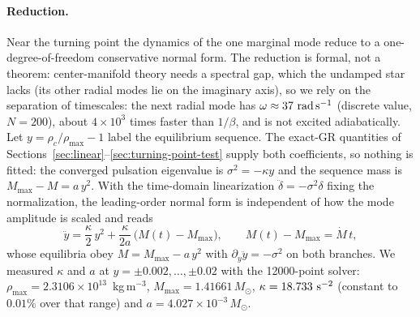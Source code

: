 \documentclass[11pt]{article}
\begin{document}
\paragraph{Reduction.} Near the turning point the dynamics of the one marginal mode reduce to a one-degree-of-freedom conservative normal form. The reduction is formal, not a theorem: center-manifold theory \citep{Carr1981,HaragusIooss2011} needs a spectral gap, which the undamped star lacks (its other radial modes lie on the imaginary axis), so we rely on the separation of timescales: the next radial mode has $\omega\approx37\ {\rm rad\,s^{-1}}$ (discrete value, $N=200$), about $4\times10^{3}$ times faster than $1/\beta$, and is not excited adiabatically. Let $y=\rho_c/\rho_{\max}-1$ label the equilibrium sequence. The exact-GR quantities of Sections~\ref{sec:linear}--\ref{sec:turning-point-test} supply both coefficients, so nothing is fitted: the converged pulsation eigenvalue is $\sigma^2=-\kappa y$ and the sequence mass is $M_{\max}-M=a\,y^2$. With the time-domain linearization $\ddot\delta=-\sigma^2\delta$ fixing the normalization, the leading-order normal form is independent of how the mode amplitude is scaled and reads
\begin{equation}
\ddot y=\frac{\kappa}{2}\,y^2+\frac{\kappa}{2a}\,\big(M(t)-M_{\max}\big),\qquad M(t)-M_{\max}=\dot M\,t ,
\label{eq:fold-nf}
\end{equation}
whose equilibria obey $M=M_{\max}-a\,y^2$ with $\partial_y\ddot y=-\sigma^2$ on both branches. We measured $\kappa$ and $a$ at $y=\pm0.002,\dots,\pm0.02$ with the 12000-point solver: $\rho_{\max}=2.3106\times10^{13}$~kg\,m$^{-3}$, $M_{\max}=1.41661\,M_\odot$, $\kappa=18.733\ {\rm s^{-2}}$ (constant to $0.01\%$ over that range) and $a=4.027\times10^{-3}\,M_\odot$.
\end{document}
